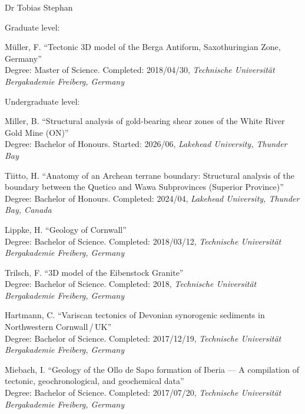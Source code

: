 \documentclass[10pt, paper=letter]{scrartcl} %
\begin{document}
\begin{cv}{\textcolor{myred}{\textsf{Dr Tobias Stephan}}}
\begin{cvlist}{Graduate level:}

        \item[1] Müller, F. \enquote{Tectonic 3D model of the Berga Antiform, Saxothuringian Zone, Germany}\\
        Degree: Master of Science.
        Completed: 2018/04/30, \textit{Technische Universität Bergakademie Freiberg, Germany}
    \end{cvlist}

    \begin{cvlist}{Undergraduate level:}
        \item[8] Miller, B. \enquote{Structural analysis of gold-bearing shear zones of the White River Gold Mine (ON)}\\
        Degree: Bachelor of Honours. Started: 2026/06, \textit{Lakehead University, Thunder Bay}

        \item[7] Tiitto, H. \enquote{Anatomy of an Archean terrane boundary:
            Structural analysis of the boundary between the Quetico and Wawa Subprovinces
            (Superior Province)}\\
        Degree: Bachelor of Honours. Completed: 2024/04, \textit{Lakehead University, Thunder
            Bay, Canada}

        \item[6] Lippke, H. \enquote{Geology of Cornwall}\\
        Degree: Bachelor of Science. Completed: 2018/03/12, \textit{Technische Universität Bergakademie Freiberg, Germany}

        \item[5] Trilsch, F. \enquote{3D model of the Eibenstock Granite}\\
        Degree: Bachelor of Science. Completed: 2018, \textit{Technische Universität Bergakademie Freiberg, Germany}

        \item[4] Hartmann, C. \enquote{Variscan tectonics of Devonian synorogenic sediments in Northwestern Cornwall\,/\,UK}\\
        Degree: Bachelor of Science. Completed: 2017/12/19, \textit{Technische Universität Bergakademie Freiberg, Germany}

        \item[3] Miebach, I. \enquote{Geology of the Ollo de Sapo formation of Iberia --- A compilation of tectonic, geochronological, and geochemical data}\\
        Degree: Bachelor of Science. Completed: 2017/07/20, \textit{Technische Universität Bergakademie Freiberg, Germany}


\end{cvlist}
\end{cv}
\end{document}
